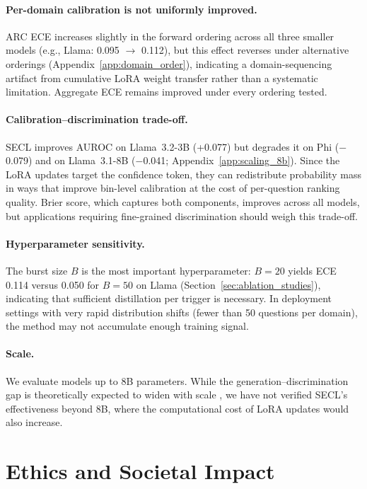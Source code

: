 \documentclass[11pt]{article}
\begin{document}
\paragraph{Per-domain calibration is not uniformly improved.}
ARC ECE increases slightly in the forward ordering across all three smaller models (e.g., Llama: 0.095 $\to$ 0.112), but this effect reverses under alternative orderings (Appendix~\ref{app:domain_order}), indicating a domain-sequencing artifact from cumulative LoRA weight transfer rather than a systematic limitation. Aggregate ECE remains improved under every ordering tested.

\paragraph{Calibration--discrimination trade-off.}
SECL improves AUROC on Llama~3.2-3B (+0.077) but degrades it on Phi ($-$0.079) and on Llama~3.1-8B ($-$0.041; Appendix~\ref{app:scaling_8b}). Since the LoRA updates target the confidence token, they can redistribute probability mass in ways that improve bin-level calibration at the cost of per-question ranking quality. Brier score, which captures both components, improves across all models, but applications requiring fine-grained discrimination should weigh this trade-off.

\paragraph{Hyperparameter sensitivity.}
The burst size $B$ is the most important hyperparameter: $B{=}20$ yields ECE 0.114 versus 0.050 for $B{=}50$ on Llama (Section~\ref{sec:ablation_studies}), indicating that sufficient distillation per trigger is necessary. In deployment settings with very rapid distribution shifts (fewer than 50 questions per domain), the method may not accumulate enough training signal.

\paragraph{Scale.}
We evaluate models up to 8B parameters. While the generation--discrimination gap is theoretically expected to widen with scale \cite{kalai_why_2025}, we have not verified SECL's effectiveness beyond 8B, where the computational cost of LoRA updates would also increase.

\section*{Ethics and Societal Impact} \label{sec:ethics}
\end{document}
